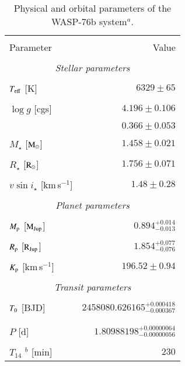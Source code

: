 \documentclass{aa}
\begin{document}
\begin{table}[]
\centering
\caption{Physical and orbital parameters of the WASP-76b system$^a$.}
\begin{tabular}{lr}
\hline \hline
\\[-1em]
 Parameter  & Value\\ \hline
 \\[-1em]
 \multicolumn{2}{c}{\it Stellar parameters}\\\noalign{\smallskip}
   \\[-1em]
\quad  $T_{\rm eff}$ [K] & $6329\pm 65$ \\
  \\[-1em]
\quad  $\log g$ [cgs]& $4.196\pm 0.106$ \\
  \\[-1em]
\quad  [Fe/H] & $0.366\pm 0.053$ \\
  \\[-1em]
\quad $M_{\star}$ [$\rm{M_{\odot}}$]& $1.458\pm0.021$ \\
  \\[-1em]
\quad $R_{\star}$ [$\rm{R_{\odot}}$]& $1.756\pm0.071$ \\
  \\[-1em]
 \quad  $v\sin i_{\star}$ [km\,s$^{-1}$]& $1.48\pm0.28$\\
  \\[-1em]
 \multicolumn{2}{c}{\it Planet parameters}\\\noalign{\smallskip}
   \\[-1em]
 \quad $M_{\rm p}$ [$\rm{M_{Jup}}$]&  $0.894^{+0.014}_{-0.013}$\\
  \\[-1em]
 \quad $R_{\rm p}$ [$\rm{R_{Jup}}$]& $1.854^{+0.077}_{-0.076}$\\
 \\[-1em]
\quad $K_{\rm p}$ [km\,s$^{-1}$]& $196.52\pm0.94$ \\
  \\[-1em]
 \multicolumn{2}{c}{\it Transit parameters}\\\noalign{\smallskip}
   \\[-1em]
 \quad $T_{\rm 0}$ [BJD] & $2458080.626165^{+0.000418}_{-0.000367}$ \\
  \\[-1em]
\\[-1em]
 \quad $P$ [d] & $1.80988198^{+0.00000064}_{-0.00000056}$ \\
  \\[-1em]
 \quad $T_{14}$ $^b$ [min] & $230$\\

\end{tabular}
\end{table}
\end{document}
